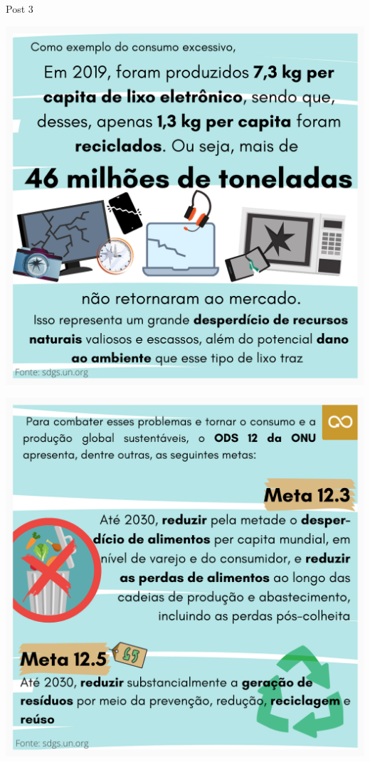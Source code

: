\documentclass{beamer}
\begin{document}
	\begin{frame}{Post 3}
		\begin{minipage}{0.49\linewidth}
			\centering
			\includegraphics[width=\linewidth]{Post 3/3.png}
		\end{minipage}
		\hfill
		\begin{minipage}{0.49\linewidth}
			\centering
			\includegraphics[width=\linewidth]{Post 3/4.png}
		\end{minipage}
	\end{frame}
	
\end{document}
